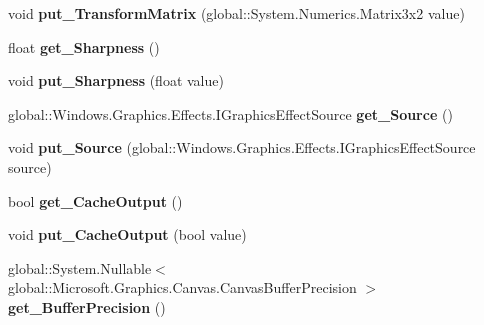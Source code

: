 \begin{DoxyCompactItemize}
void {\bfseries put\+\_\+\+Transform\+Matrix} (global\+::\+System.\+Numerics.\+Matrix3x2 value)
\item 
\mbox{\label{class_microsoft_1_1_graphics_1_1_canvas_1_1_effects_1_1_transform2_d_effect_aa820a4ea7ef6fe6bb2d75e16c55e2d44}} 
float {\bfseries get\+\_\+\+Sharpness} ()
\item 
\mbox{\label{class_microsoft_1_1_graphics_1_1_canvas_1_1_effects_1_1_transform2_d_effect_af157b24374215992f857b4060fe2ed79}} 
void {\bfseries put\+\_\+\+Sharpness} (float value)
\item 
\mbox{\label{class_microsoft_1_1_graphics_1_1_canvas_1_1_effects_1_1_transform2_d_effect_af35c6e93668e25c4c57cbcbce7286516}} 
global\+::\+Windows.\+Graphics.\+Effects.\+I\+Graphics\+Effect\+Source {\bfseries get\+\_\+\+Source} ()
\item 
\mbox{\label{class_microsoft_1_1_graphics_1_1_canvas_1_1_effects_1_1_transform2_d_effect_a89344f36eb3d3c2b19dbe91b8d618d90}} 
void {\bfseries put\+\_\+\+Source} (global\+::\+Windows.\+Graphics.\+Effects.\+I\+Graphics\+Effect\+Source source)
\item 
\mbox{\label{class_microsoft_1_1_graphics_1_1_canvas_1_1_effects_1_1_transform2_d_effect_a0fa10cae13f8320eff8aec6d07d06087}} 
bool {\bfseries get\+\_\+\+Cache\+Output} ()
\item 
\mbox{\label{class_microsoft_1_1_graphics_1_1_canvas_1_1_effects_1_1_transform2_d_effect_a83fe51eac7119fbca7ce7c753822cb8f}} 
void {\bfseries put\+\_\+\+Cache\+Output} (bool value)
\item 
\mbox{\label{class_microsoft_1_1_graphics_1_1_canvas_1_1_effects_1_1_transform2_d_effect_a880fa5f2233568b3627f428cc5de4d8f}} 
global\+::\+System.\+Nullable$<$ global\+::\+Microsoft.\+Graphics.\+Canvas.\+Canvas\+Buffer\+Precision $>$ {\bfseries get\+\_\+\+Buffer\+Precision} ()

\end{DoxyCompactItemize}
